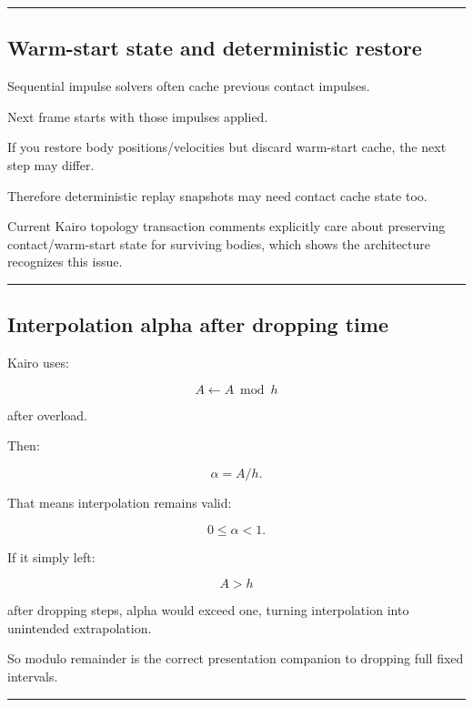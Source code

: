 \begin{center}\rule{0.5\linewidth}{0.5pt}\end{center}

\subsection{Warm-start state and deterministic restore}\label{06-engine-ii-ch038-warm-start-state-and-deterministic-restore}

Sequential impulse solvers often cache previous contact impulses.

Next frame starts with those impulses applied.

If you restore body positions/velocities but discard warm-start cache, the next step may differ.

Therefore deterministic replay snapshots may need contact cache state too.

Current Kairo topology transaction comments explicitly care about preserving contact/warm-start state for surviving bodies, which shows the architecture recognizes this issue.

\begin{center}\rule{0.5\linewidth}{0.5pt}\end{center}

\subsection{Interpolation alpha after dropping time}\label{06-engine-ii-ch038-interpolation-alpha-after-dropping-time}

Kairo uses:

\[
A\leftarrow A\bmod h
\]

after overload.

Then:

\[
\alpha=A/h.
\]

That means interpolation remains valid:

\[
0\le\alpha<1.
\]

If it simply left:

\[
A>h
\]

after dropping steps, alpha would exceed one, turning interpolation into unintended extrapolation.

So modulo remainder is the correct presentation companion to dropping full fixed intervals.

\begin{center}\rule{0.5\linewidth}{0.5pt}\end{center}

